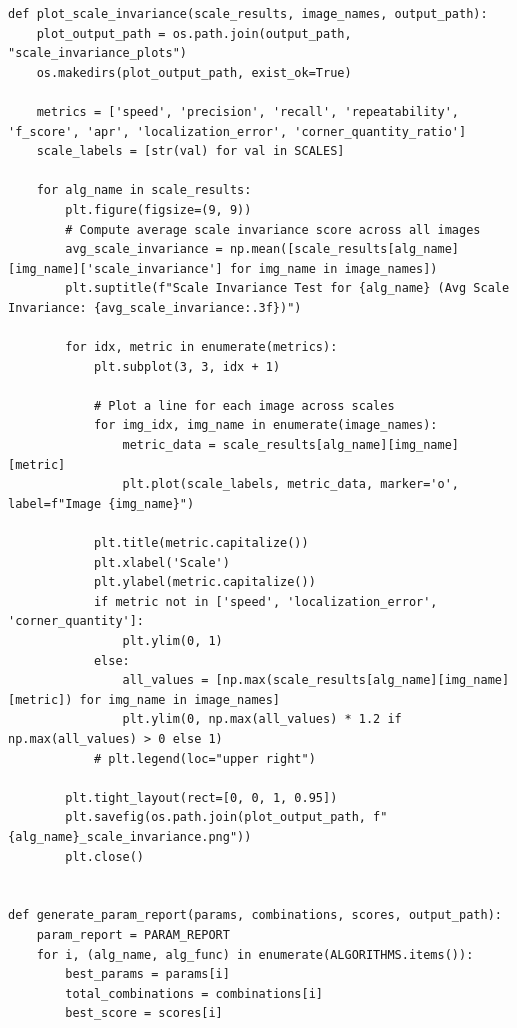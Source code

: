 \documentclass[journal]{IEEEtran}
\begin{document}
\begin{lstlisting}[style=python, caption={Utility Functions for Data Processing}, label={lst:utilities}]
def plot_scale_invariance(scale_results, image_names, output_path):
    plot_output_path = os.path.join(output_path, "scale_invariance_plots")
    os.makedirs(plot_output_path, exist_ok=True)
    
    metrics = ['speed', 'precision', 'recall', 'repeatability', 'f_score', 'apr', 'localization_error', 'corner_quantity_ratio']
    scale_labels = [str(val) for val in SCALES]
    
    for alg_name in scale_results:
        plt.figure(figsize=(9, 9))
        # Compute average scale invariance score across all images
        avg_scale_invariance = np.mean([scale_results[alg_name][img_name]['scale_invariance'] for img_name in image_names])
        plt.suptitle(f"Scale Invariance Test for {alg_name} (Avg Scale Invariance: {avg_scale_invariance:.3f})")
        
        for idx, metric in enumerate(metrics):
            plt.subplot(3, 3, idx + 1)
            
            # Plot a line for each image across scales
            for img_idx, img_name in enumerate(image_names):
                metric_data = scale_results[alg_name][img_name][metric]
                plt.plot(scale_labels, metric_data, marker='o', label=f"Image {img_name}")
            
            plt.title(metric.capitalize())
            plt.xlabel('Scale')
            plt.ylabel(metric.capitalize())
            if metric not in ['speed', 'localization_error', 'corner_quantity']:
                plt.ylim(0, 1)
            else:
                all_values = [np.max(scale_results[alg_name][img_name][metric]) for img_name in image_names]
                plt.ylim(0, np.max(all_values) * 1.2 if np.max(all_values) > 0 else 1)
            # plt.legend(loc="upper right")
        
        plt.tight_layout(rect=[0, 0, 1, 0.95])
        plt.savefig(os.path.join(plot_output_path, f"{alg_name}_scale_invariance.png"))
        plt.close() 
        

def generate_param_report(params, combinations, scores, output_path):
    param_report = PARAM_REPORT
    for i, (alg_name, alg_func) in enumerate(ALGORITHMS.items()):
        best_params = params[i]
        total_combinations = combinations[i]
        best_score = scores[i]
        

\end{lstlisting}
\end{document}
